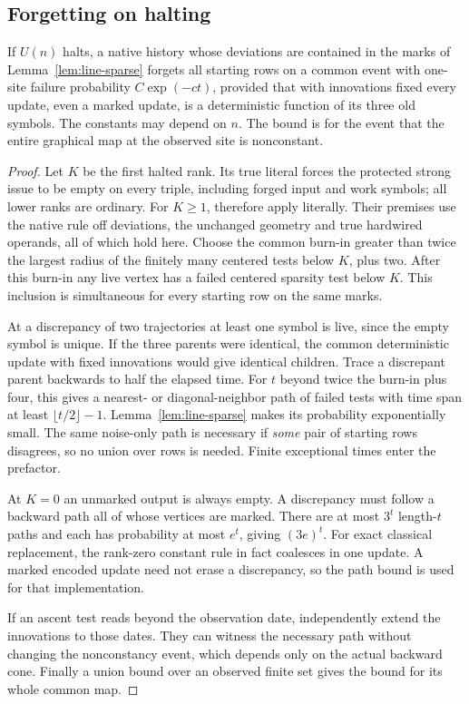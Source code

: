 \subsection{Forgetting on halting}
\begin{lemma}\label{lem:line-forget}
If $U(n)$ halts, a native history whose deviations are contained in
the marks of Lemma~\ref{lem:line-sparse} forgets all starting rows on a
common event with one-site failure probability $C\exp(-ct)$, provided
that with innovations fixed every update, even a marked update, is a
deterministic function of its three old symbols. The constants may
depend on $n$. The bound is for the event that the entire graphical
map at the observed site is nonconstant.
\end{lemma}
\begin{proof}
Let $K$ be the first halted rank. Its true literal forces the protected
strong issue to be empty on every triple, including forged input and
work symbols; all lower ranks are ordinary. For $K\ge1$,
\cite[Lemmas~6.2--6.3]{DMline} therefore apply literally. Their premises
use the native rule off deviations, the unchanged geometry and
true hardwired operands, all of which hold here. Choose the common
burn-in greater than twice the largest radius of the finitely many
centered tests below $K$, plus two. After this burn-in any live vertex
has a failed centered sparsity test below $K$. This inclusion is
simultaneous for every starting row on the same marks.

At a discrepancy of two trajectories at least one symbol is live,
since the empty symbol is unique. If the three parents were identical,
the common deterministic update with fixed innovations would give
identical children. Trace a discrepant parent backwards to half the
elapsed time. For $t$ beyond twice the burn-in plus four, this gives a
nearest- or diagonal-neighbor path of failed tests with time span at
least $\lfloor t/2\rfloor-1$. Lemma~\ref{lem:line-sparse} makes its
probability exponentially small. The same noise-only path is necessary
if \emph{some} pair of starting rows disagrees, so no union over rows
is needed. Finite exceptional times enter the prefactor.

At $K=0$ an unmarked output is always empty. A discrepancy must follow
a backward path all of whose vertices are marked. There are at most
$3^t$ length-$t$ paths and each has probability at most $e^t$, giving
$(3e)^t$. For exact classical replacement, the rank-zero constant rule
in fact coalesces in one update. A marked encoded update need not erase
a discrepancy, so the path bound is used for that implementation.

If an ascent test reads beyond the observation date, independently
extend the innovations to those dates. They can witness the necessary
path without changing the nonconstancy event, which depends only on
the actual backward cone. Finally a union bound over an observed finite
set gives the bound for its whole common map.
\end{proof}

